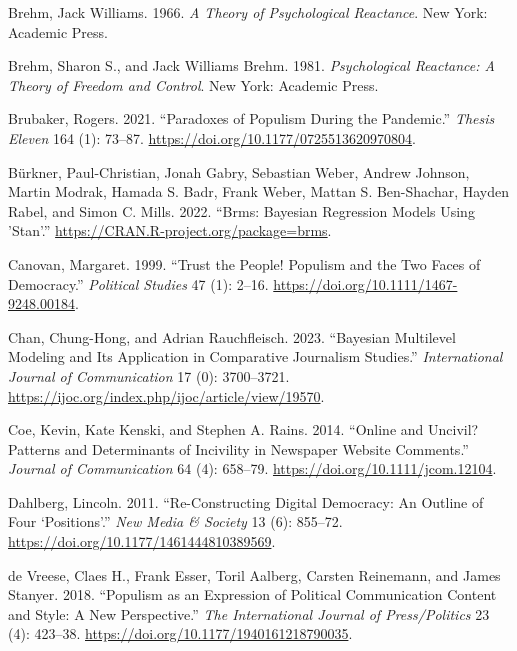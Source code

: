 \documentclass[
]{ccr}
\newlength{\cslhangindent}
\newlength{\cslentryspacingunit} %
\newenvironment{CSLReferences}[2] %
 {%
  \setlength{\parindent}{0pt}
  \ifodd #1
  \let\oldpar\par
  \def\par{\hangindent=\cslhangindent\oldpar}
  \fi
  \setlength{\parskip}{#2\cslentryspacingunit}
 }%
 {}
\begin{document}
\begin{CSLReferences}{1}{0}
\leavevmode{}%
Brehm, Jack Williams. 1966. \emph{A Theory of Psychological Reactance}.
{New York}: {Academic Press}.

\leavevmode{}%
Brehm, Sharon S., and Jack Williams Brehm. 1981. \emph{Psychological
Reactance: A Theory of Freedom and Control}. {New York}: {Academic
Press}.

\leavevmode{}%
Brubaker, Rogers. 2021. {``Paradoxes of Populism During the Pandemic.''}
\emph{Thesis Eleven} 164 (1): 73--87.
\url{https://doi.org/10.1177/0725513620970804}.

\leavevmode{}%
Bürkner, Paul-Christian, Jonah Gabry, Sebastian Weber, Andrew Johnson,
Martin Modrak, Hamada S. Badr, Frank Weber, Mattan S. Ben-Shachar,
Hayden Rabel, and Simon C. Mills. 2022. {``Brms: {Bayesian Regression
Models} Using '{Stan}'.''}
\url{https://CRAN.R-project.org/package=brms}.

\leavevmode{}%
Canovan, Margaret. 1999. {``Trust the People! {Populism} and the Two
Faces of Democracy.''} \emph{Political Studies} 47 (1): 2--16.
\url{https://doi.org/10.1111/1467-9248.00184}.

\leavevmode{}%
Chan, Chung-Hong, and Adrian Rauchfleisch. 2023. {``Bayesian {Multilevel
Modeling} and {Its Application} in {Comparative Journalism Studies}.''}
\emph{International Journal of Communication} 17 (0): 3700--3721.
\url{https://ijoc.org/index.php/ijoc/article/view/19570}.

\leavevmode{}%
Coe, Kevin, Kate Kenski, and Stephen A. Rains. 2014. {``Online and
Uncivil? {Patterns} and Determinants of Incivility in Newspaper Website
Comments.''} \emph{Journal of Communication} 64 (4): 658--79.
\url{https://doi.org/10.1111/jcom.12104}.

\leavevmode{}%
Dahlberg, Lincoln. 2011. {``Re-Constructing Digital Democracy: {An}
Outline of Four {`Positions'}.''} \emph{New Media \& Society} 13 (6):
855--72. \url{https://doi.org/10.1177/1461444810389569}.

\leavevmode{}%
de Vreese, Claes H., Frank Esser, Toril Aalberg, Carsten Reinemann, and
James Stanyer. 2018. {``Populism as an Expression of Political
Communication Content and Style: {A} New Perspective.''} \emph{The
International Journal of Press/Politics} 23 (4): 423--38.
\url{https://doi.org/10.1177/1940161218790035}.


\end{CSLReferences}
\end{document}
